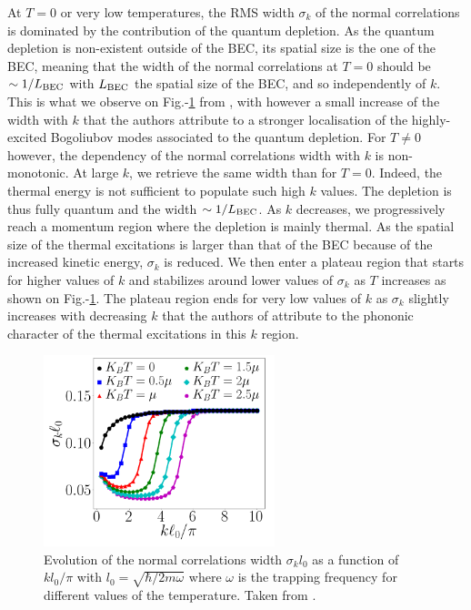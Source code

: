 At $T=0$ or very low temperatures, the RMS width $\sigma_k$ of the normal correlations is dominated by the contribution of the quantum depletion. As the quantum depletion is non-existent outside of the BEC, its spatial size is the one of the BEC, meaning that the width of the normal correlations at $T=0$ should be $\sim 1/L_{\rm{BEC}}$ with $L_{\rm{BEC}}$ the spatial size of the BEC, and so independently of $k$. This is what we observe on Fig.-\ref{fig:butera_kk} from \cite{butera2020}, with however a small increase of the width with $k$ that the authors attribute to a stronger localisation of the highly-excited Bogoliubov modes associated to the quantum depletion.
For $T \neq 0$ however, the dependency of the normal correlations width with $k$ is non-monotonic. At large $k$, we retrieve the same width than for $T=0$. Indeed, the thermal energy is not sufficient to populate such high $k$ values. The depletion is thus fully quantum and the width $\sim 1/L_{\rm{BEC}}$. As $k$ decreases, we progressively reach a momentum region where the depletion is mainly thermal. As the spatial size of the thermal excitations is larger than that of the BEC because of the increased kinetic energy, $\sigma_k$ is reduced. We then enter a plateau region that starts for higher values of $k$ and stabilizes around lower values of $\sigma_k$ as $T$ increases as shown on Fig.-\ref{fig:butera_kk}. The plateau region ends for very low values of $k$ as $\sigma_k$ slightly increases with decreasing $k$ that the authors of \cite{butera2020} attribute to the phononic character of the thermal excitations in this $k$ region.


\begin{figure}
    \centering
    \includegraphics[width=0.6\textwidth]{Fig/Chapter1/butera.png}
    \caption[Evolution of the normal correlations width with $k$ for different values of the temperature]{Evolution of the normal correlations width $\sigma_k l_0$ as a function of $k l_0/\pi$ with $l_0=\sqrt{\hbar/2m \omega}$ where $\omega$ is the trapping frequency for different values of the temperature. Taken from \cite{butera2020}.}
    \label{fig:butera_kk}
\end{figure}

